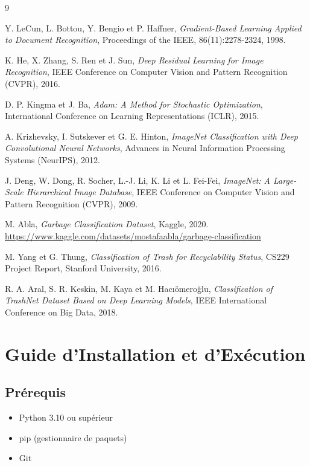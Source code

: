 \documentclass[12pt,a4paper]{report}
\begin{document}
\begin{thebibliography}{9}

Y. LeCun, L. Bottou, Y. Bengio et P. Haffner,
\textit{Gradient-Based Learning Applied to Document Recognition},
Proceedings of the IEEE, 86(11):2278-2324, 1998.

K. He, X. Zhang, S. Ren et J. Sun,
\textit{Deep Residual Learning for Image Recognition},
IEEE Conference on Computer Vision and Pattern Recognition (CVPR), 2016.

D. P. Kingma et J. Ba,
\textit{Adam: A Method for Stochastic Optimization},
International Conference on Learning Representations (ICLR), 2015.

A. Krizhevsky, I. Sutskever et G. E. Hinton,
\textit{ImageNet Classification with Deep Convolutional Neural Networks},
Advances in Neural Information Processing Systems (NeurIPS), 2012.

J. Deng, W. Dong, R. Socher, L.-J. Li, K. Li et L. Fei-Fei,
\textit{ImageNet: A Large-Scale Hierarchical Image Database},
IEEE Conference on Computer Vision and Pattern Recognition (CVPR), 2009.

M. Abla,
\textit{Garbage Classification Dataset},
Kaggle, 2020.
\url{https://www.kaggle.com/datasets/mostafaabla/garbage-classification}

M. Yang et G. Thung,
\textit{Classification of Trash for Recyclability Status},
CS229 Project Report, Stanford University, 2016.

R. A. Aral, S. R. Keskin, M. Kaya et M. Hacıömeroğlu,
\textit{Classification of TrashNet Dataset Based on Deep Learning Models},
IEEE International Conference on Big Data, 2018.

\end{thebibliography}

\appendix

\chapter{Guide d'Installation et d'Exécution}

\section{Prérequis}
\begin{itemize}
    \item Python 3.10 ou supérieur
    \item pip (gestionnaire de paquets)
    \item Git
\end{itemize}
\end{document}
